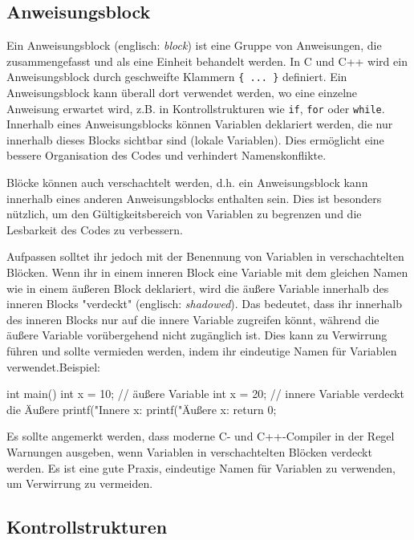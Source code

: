 \subsection{Anweisungsblock}
\label{sec:referenz:c:block}

Ein Anweisungsblock (englisch: \textit{block}) ist eine Gruppe von Anweisungen, die zusammengefasst und als eine Einheit behandelt werden. In C und C++ wird ein Anweisungsblock durch geschweifte Klammern \texttt{\{ ... \}} definiert. Ein Anweisungsblock kann überall dort verwendet werden, wo eine einzelne Anweisung erwartet wird, z.B. in Kontrollstrukturen wie \texttt{if}, \texttt{for} oder \texttt{while}. Innerhalb eines Anweisungsblocks können Variablen deklariert werden, die nur innerhalb dieses Blocks sichtbar sind (lokale Variablen). Dies ermöglicht eine bessere Organisation des Codes und verhindert Namenskonflikte.

Blöcke können auch verschachtelt werden, d.h. ein Anweisungsblock kann innerhalb eines anderen Anweisungsblocks enthalten sein. Dies ist besonders nützlich, um den Gültigkeitsbereich von Variablen zu begrenzen und die Lesbarkeit des Codes zu verbessern.

Aufpassen solltet ihr jedoch mit der Benennung von Variablen in verschachtelten Blöcken. Wenn ihr in einem inneren Block eine Variable mit dem gleichen Namen wie in einem äußeren Block deklariert, wird die äußere Variable innerhalb des inneren Blocks "verdeckt" (englisch: \textit{shadowed}). Das bedeutet, dass ihr innerhalb des inneren Blocks nur auf die innere Variable zugreifen könnt, während die äußere Variable vorübergehend nicht zugänglich ist. Dies kann zu Verwirrung führen und sollte vermieden werden, indem ihr eindeutige Namen für Variablen verwendet.Beispiel:
\begin{code}
int main() {
    int x = 10; // äußere Variable
    {
        int x = 20; // innere Variable verdeckt die Äußere
        printf("Innere x: %
    }
    printf("Äußere x: %
    return 0;
}
\end{code}
Es sollte angemerkt werden, dass moderne C- und C++-Compiler in der Regel Warnungen ausgeben, wenn Variablen in verschachtelten Blöcken verdeckt werden. Es ist eine gute Praxis, eindeutige Namen für Variablen zu verwenden, um Verwirrung zu vermeiden.

\subsection{Kontrollstrukturen}
\label{sec:referenz:c:kontrollstrukturen}

